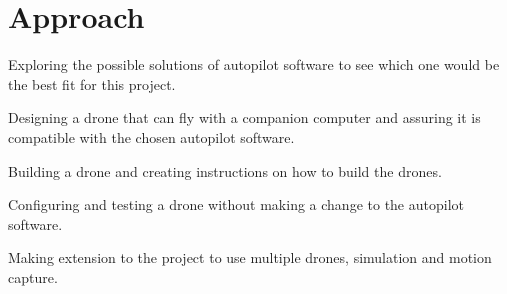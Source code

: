 \section{Approach}
Exploring the possible solutions of autopilot software to see which one would be the best fit for this project.

Designing a drone that can fly with a companion computer and assuring it is compatible with the chosen autopilot software.

Building a drone and creating instructions on how to build the drones.

Configuring and testing a drone without making a change to the autopilot software.

Making extension to the project to use multiple drones, simulation and motion capture.

